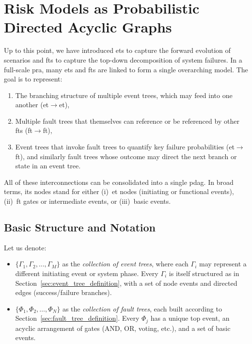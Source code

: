 \section{Risk Models as Probabilistic Directed Acyclic Graphs}
\label{sec:unified_pra_dag}

Up to this point, we have introduced \acrshort{et}s to capture the forward evolution of scenarios and \acrshort{ft}s to capture the top-down decomposition of system failures. In a full-scale \acrshort{pra}, many \acrshort{et}s and \acrshort{ft}s are linked to form a single overarching model. The goal is to represent:
\begin{enumerate}
\item The branching structure of multiple event trees, which may feed into one another (\acrshort{et}\(\to\)\acrshort{et}),  
\item Multiple fault trees that themselves can reference or be referenced by other \acrshort{ft}s (\acrshort{ft}\(\to\)\acrshort{ft}),  
\item Event trees that invoke fault trees to quantify key failure probabilities (\acrshort{et}\(\to\)\acrshort{ft}), and similarly fault trees whose outcome may direct the next branch or state in an event tree.  
\end{enumerate}
All of these interconnections can be consolidated into a single \acrshort{pdag}.  In broad terms, its nodes stand for either (i)~\acrshort{et} nodes (initiating or functional events), (ii)~\acrshort{ft} gates or intermediate events, or (iii)~basic events.

\subsection{Basic Structure and Notation}
Let us denote:
\begin{itemize}
\item \(\{\Gamma_1, \Gamma_2, \dots, \Gamma_{M}\}\) as the \emph{collection of event trees}, where each \(\Gamma_{i}\) may represent a different initiating event or system phase.  Every \(\Gamma_i\) is itself structured as in Section~\ref{sec:event_tree_definition}, with a set of node events and directed edges (success/failure branches).  
\item \(\{\Phi_{1}, \Phi_{2}, \dots, \Phi_{N}\}\) as the \emph{collection of fault trees}, each built according to Section~\ref{sec:fault_tree_definition}.  Every \(\Phi_j\) has a unique top event, an acyclic arrangement of gates (AND, OR, voting, etc.), and a set of basic events.  
\end{itemize}

